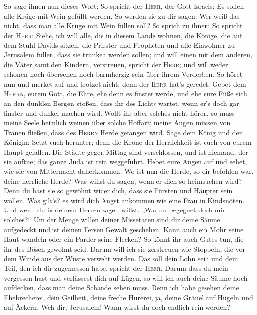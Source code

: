  So sage ihnen nun dieses Wort: So spricht der
\textsc{Herr}, der Gott Israels: Es sollen alle Krüge mit Wein gefüllt
werden. So werden sie zu dir sagen: Wer weiß das nicht, dass man alle
Krüge mit Wein füllen soll?  So sprich zu ihnen: So
spricht der \textsc{Herr}: Siehe, ich will alle, die in diesem Lande
wohnen, die Könige, die auf dem Stuhl Davids sitzen, die Priester und
Propheten und alle Einwohner zu Jerusalem füllen, dass sie trunken
werden sollen;  und will einen mit dem anderen, die Väter
samt den Kindern, verstreuen, spricht der \textsc{Herr}; und will weder
schonen noch übersehen noch barmherzig sein über ihrem Verderben.
 So höret nun und merket auf und trotzet nicht; denn der
\textsc{Herr} hat's geredet.  Gebet dem \textsc{Herrn},
eurem Gott, die Ehre, ehe denn es finster werde, und ehe eure Füße sich
an den dunklen Bergen stoßen, dass ihr des Lichts wartet, wenn er's doch
gar finster und dunkel machen wird.  Wollt ihr aber
solches nicht hören, so muss meine Seele heimlich weinen über solche
Hoffart; meine Augen müssen von Tränen fließen, dass des \textsc{Herrn}
Herde gefangen wird.  Sage dem König und der Königin:
Setzt euch herunter; denn die Krone der Herrlichkeit ist euch von eurem
Haupt gefallen.  Die Städte gegen Mittag sind
verschlossen, und ist niemand, der sie auftue; das ganze Juda ist rein
weggeführt.  Hebet eure Augen auf und sehet, wie sie von
Mitternacht daherkommen. Wo ist nun die Herde, so dir befohlen war,
deine herrliche Herde?  Was willst du sagen, wenn er dich
so heimsuchen wird? Denn du hast sie so gewöhnt wider dich, dass sie
Fürsten und Häupter sein wollen. Was gilt's? es wird dich Angst ankommen
wie eine Frau in Kindsnöten.  Und wenn du in deinem
Herzen sagen willst: „Warum begegnet doch mir solches?{}`` Um der Menge
willen deiner Missetaten sind dir deine Säume aufgedeckt und ist deinen
Fersen Gewalt geschehen.  Kann auch ein Mohr seine Haut
wandeln oder ein Parder seine Flecken? So könnt ihr auch Gutes tun, die
ihr des Bösen gewohnt seid.  Darum will ich sie
zerstreuen wie Stoppeln, die vor dem Winde aus der Wüste verweht werden.
 Das soll dein Lohn sein und dein Teil, den ich dir
zugemessen habe, spricht der \textsc{Herr}. Darum dass du mein vergessen
hast und verlässest dich auf Lügen,  so will ich auch
deine Säume hoch aufdecken, dass man deine Schande sehen muss.
 Denn ich habe gesehen deine Ehebrecherei, dein Geilheit,
deine freche Hurerei, ja, deine Gräuel auf Hügeln und auf Äckern. Weh
dir, Jerusalem! Wann wirst du doch endlich rein werden?

